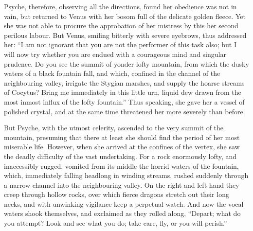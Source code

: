 \documentclass{article}
\begin{document}
Psyche, therefore, observing all the directions, found her obedience was not in
vain, but returned to Venus with her bosom full of the delicate golden fleece.
Yet she was not able to procure the approbation of her mistress by this her
second perilous labour. But Venus, smiling bitterly with severe eyebrows, thus
addressed her: ``I am not ignorant that you are not the performer of this task
also; but I will now try whether you are endued with a courageous mind and
singular prudence. Do you see the summit of yonder lofty mountain, from which
the dusky waters of a black fountain fall, and which, confined in the channel
of the neighbouring valley, irrigate the Stygian marshes, and supply the hoarse
streams of Cocytus? Bring me immediately in this little urn, liquid dew drawn
from the most inmost influx of the lofty fountain.'' Thus speaking, she gave
her a vessel of polished crystal, and at the same time threatened her more
severely than before.

But Psyche, with the utmost celerity, ascended to the very summit of the
mountain, presuming that there at least she should find the period of her most
miserable life. However, when she arrived at the confines of the vertex, she
saw the deadly difficulty of the vast undertaking. For a rock enormously
lofty, and inaccessibly rugged, vomited from its middle the horrid waters of
the fountain, which, immediately falling headlong in winding streams, rushed
suddenly through a narrow channel into the neighbouring valley. On the right
and left hand they creep through hollow rocks, over which fierce dragons
stretch out their long necks, and with unwinking vigilance keep a perpetual
watch. And now the vocal waters shook themselves, and exclaimed as they rolled
along, ``Depart; what do you attempt? Look and see what you do; take care, fly,
or you will perish.''
\end{document}
